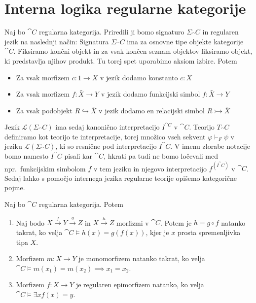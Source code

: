 \documentclass[../kategoricna_logika.tex]{subfiles}
\begin{document}
\section{Interna logika regularne kategorije}
Naj bo $\cat{C}$ regularna kategorija.
Priredili ji bomo signaturo $\Sigma_\cat{C}$ in regularen jezik na naslednji način:
Signatura $\Sigma_\cat{C}$ ima za osnovne tipe objekte kategorije $\cat{C}$.
Fiksiramo končni objekt in za vsak končen seznam objektov fiksiramo objekt, ki predstavlja njihov produkt.
Tu torej spet uporabimo aksiom izbire. Potem
\begin{itemize}
  \item Za vsak morfizem $c : 1 \to X$ v jezik dodamo konstanto $c:X$
  \item Za vsak morfizem $f : \bar{X} \to Y$ v jezik dodamo funkcijski simbol $f : \bar{X} \to Y$
  \item Za vsak podobjekt $R \hookrightarrow \bar{X}$ v jezik dodamo en relacijski simbol $R \rightarrowtail \bar{X}$
\end{itemize}
Jezik $\mathcal{L}(\Sigma_\cat{C})$ ima sedaj kanonično interpretacijo $I^{\cat{C}}$ v $\cat{C}$.
Teorijo $T_\cat{C}$ definiramo kot teorijo te interpretacije, torej množico vseh sekvent
$\varphi \vdash_F \psi$ v jeziku $\mathcal{L}(\Sigma_\cat{C})$, ki so resnične pod interpretacijo $I^\cat{C}$.
V imenu zlorabe notacije bomo namesto $I^\cat{C}$ pisali kar $\cat{C}$, 
hkrati pa tudi ne bomo ločevali med npr.\ funkcijskim simbolom $f$ v tem jeziku in njegovo interpretacijo $f^{(I^\cat{C})}$ v $\cat{C}$.
Sedaj lahko s pomočjo internega jezika regularne teorije opišemo kategorične pojme.
\begin{lema}\label{lema:morfizmi-v-regularni-logiki}
  Naj bo $\cat{C}$ regularna kategorija. Potem
  \begin{enumerate}[label=(\roman*)]
    \item Naj bodo $X \xrightarrow{f} Y \xrightarrow{g} Z$ in $X \xrightarrow{h} Z$ morfizmi v $\cat{C}$.
      Potem je $h = g \circ f$ natanko takrat, ko velja ${\cat{C} \models h(x) = g(f(x))}$,
      kjer je $x$ prosta spremenljivka tipa $X$.
    \item Morfizem $m : X \to Y$ je monomorfizem natanko takrat, ko velja $\cat{C} \models m(x_1) = m(x_2) \implies x_1 = x_2$.
    \item Morfizem $f : X \to Y$ je regularen epimorfizem natanko, ko velja $\cat{C} \models \exists x f(x) = y$.
  \end{enumerate}
\end{lema}
\end{document}

